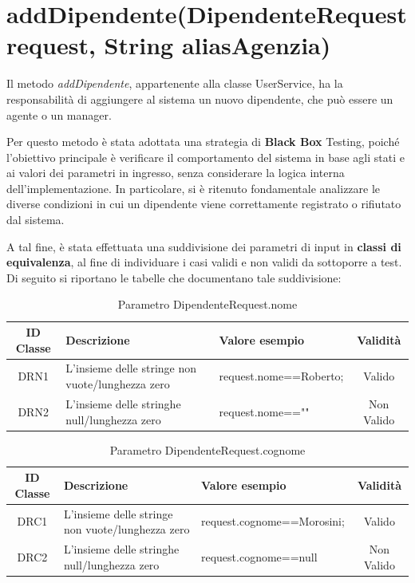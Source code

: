 \section{addDipendente(DipendenteRequest request, String aliasAgenzia)}

Il metodo \textit{addDipendente}, appartenente alla classe UserService, ha la responsabilità di aggiungere al sistema un nuovo dipendente, che può essere un agente o un manager.

Per questo metodo è stata adottata una strategia di\textbf{ Black Box} Testing, poiché l’obiettivo principale è verificare il comportamento del sistema in base agli stati e ai valori dei parametri in ingresso, senza considerare la logica interna dell’implementazione. In particolare, si è ritenuto fondamentale analizzare le diverse condizioni in cui un dipendente viene correttamente registrato o rifiutato dal sistema.

A tal fine, è stata effettuata una suddivisione dei parametri di input in \textbf{classi di equivalenza}, al fine di individuare i casi validi e non validi da sottoporre a test. Di seguito si riportano le tabelle che documentano tale suddivisione:

\begin{table}[H]
	\centering
	\begin{tabular}{|c|p{4cm}|p{5cm}|c|} 
		\hline
		\textbf{ID Classe} & \textbf{Descrizione} & \textbf{Valore esempio} & \textbf{Validità} \\
		\hline
		DRN1 & L'insieme delle stringe non vuote/lunghezza zero
		& request.nome==Roberto; & Valido \\
		\hline
		DRN2 & L'insieme delle stringhe null/lunghezza zero
		& request.nome=="" & Non Valido \\
		\hline
	\end{tabular}
	\caption{Parametro DipendenteRequest.nome}
	\label{tab:parametriDipendenteRequestNome}
\end{table}

\begin{table}[H]
	\centering
	\begin{tabular}{|c|p{6cm}|p{5cm}|c|} 
		\hline
		\textbf{ID Classe} & \textbf{Descrizione} & \textbf{Valore esempio} & \textbf{Validità} \\
		\hline
		DRC1 & L'insieme delle stringe non vuote/lunghezza zero
		& request.cognome==Morosini; & Valido \\
		\hline
		DRC2 & L'insieme delle stringhe null/lunghezza zero
		& request.cognome==null & Non Valido \\
		\hline
	\end{tabular}
	\caption{Parametro DipendenteRequest.cognome}
	\label{tab:parametriDipendenteRequestCognome}
\end{table}

